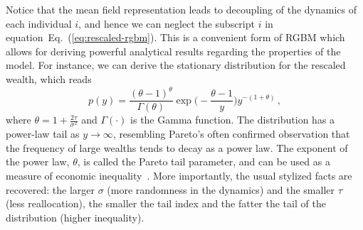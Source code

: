 \documentclass[11pt]{article}
\newcommand{\eref}[1]{Eq.~(\ref{eq:#1})}
\newcommand{\be}{\begin{equation}}
\newcommand{\ee}{\end{equation}}
\numberwithin{equation}{section}
\begin{document}
Notice that the mean field representation leads to decoupling of the dynamics of each individual $i$, and hence we can neglect the subscript $i$ in equation~\eref{rescaled-rgbm}. This is a convenient form of RGBM which allows for deriving powerful analytical results regarding the properties of the model. For instance, we can derive the stationary distribution for the rescaled wealth, which reads
%
\be
p(y) = \frac{(\theta - 1)^{\theta}}{\Gamma(\theta)} \exp{\big(-\frac{\theta - 1}{y}\big)} y^{-(1+\theta)}\,,
\label{eq:rgbm-stationary-distribution}
\ee
%
where $\theta = 1 + \frac{2 \tau}{\sigma^2}$ and $\Gamma(\cdot)$ is the Gamma function. The distribution has a power-law tail as $y \to \infty$,
resembling Pareto's often confirmed observation that the frequency of large wealths tends to decay as a power law. The exponent of the power law, $\theta$, is called the Pareto tail parameter, and can be used as a measure of economic inequality~\citep{Cowell2011}. More importantly, the usual stylized facts are recovered: the larger $\sigma$ (more randomness in the dynamics) and the smaller $\tau$ (less reallocation), the smaller the tail index and the fatter the tail of the distribution (higher inequality).



\end{document}
